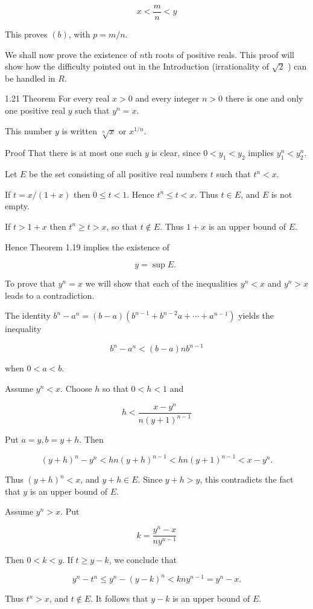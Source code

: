 \documentclass[10pt]{article}
\begin{document}
$$
x<\frac{m}{n}<y
$$

This proves $(b)$, with $p=m / n$.

We shall now prove the existence of $n$th roots of positive reals. This proof will show how the difficulty pointed out in the Introduction (irrationality of $\sqrt{2}$ ) can be handled in $R$.

1.21 Theorem For every real $x>0$ and every integer $n>0$ there is one and only one positive real $y$ such that $y^{n}=x$.

This number $y$ is written $\sqrt[n]{x}$ or $x^{1 / n}$.

Proof That there is at most one such $y$ is clear, since $0<y_{1}<y_{2}$ implies $y_{1}^{n}<y_{2}^{n}$.

Let $E$ be the set consisting of all positive real numbers $t$ such that $t^{n}<x$.

If $t=x /(1+x)$ then $0 \leq t<1$. Hence $t^{n} \leq t<x$. Thus $t \in E$, and $E$ is not empty.

If $t>1+x$ then $t^{n} \geq t>x$, so that $t \notin E$. Thus $1+x$ is an upper bound of $E$.

Hence Theorem 1.19 implies the existence of

$$
y=\sup E \text {. }
$$

To prove that $y^{n}=x$ we will show that each of the inequalities $y^{n}<x$ and $y^{n}>x$ leads to a contradiction.

The identity $b^{n}-a^{n}=(b-a)\left(b^{n-1}+b^{n-2} a+\cdots+a^{n-1}\right)$ yields the inequality

$$
b^{n}-a^{n}<(b-a) n b^{n-1}
$$

when $0<a<b$.

Assume $y^{n}<x$. Choose $h$ so that $0<h<1$ and

$$
h<\frac{x-y^{n}}{n(y+1)^{n-1}}
$$

Put $a=y, b=y+h$. Then

$$
(y+h)^{n}-y^{n}<h n(y+h)^{n-1}<h n(y+1)^{n-1}<x-y^{n} .
$$

Thus $(y+h)^{n}<x$, and $y+h \in E$. Since $y+h>y$, this contradicts the fact that $y$ is an upper bound of $E$.

Assume $y^{n}>x$. Put

$$
k=\frac{y^{n}-x}{n y^{n-1}}
$$

Then $0<k<y$. If $t \geq y-k$, we conclude that

$$
y^{n}-t^{n} \leq y^{n}-(y-k)^{n}<k n y^{n-1}=y^{n}-x .
$$

Thus $t^{n}>x$, and $t \notin E$. It follows that $y-k$ is an upper bound of $E$.
\end{document}
